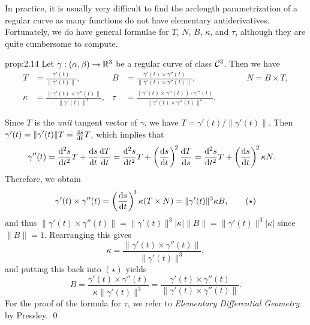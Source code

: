 In practice, it is usually very difficult to find the arclength 
parametrization of a regular curve as many functions do not 
have elementary antiderivatives. Fortunately, we do have general formulae for 
$T$, $N$, $B$, $\kappa$, and $\tau$, although they are quite cumbersome to 
compute.

\begin{prop}{prop:2.14}
    Let $\gamma : (\alpha, \beta) \to \mathbb{R}^3$ be a regular curve of class ${\cal C}^3$. 
    Then we have 
    \begin{align*}
        T &= \frac{\gamma'(t)}{\|\gamma'(t)\|}, &
        B &= \frac{\gamma'(t) \times \gamma''(t)}{\|\gamma'(t) \times \gamma''(t)\|}, \quad\quad\quad\quad\quad\quad 
        N = B \times T, \\ 
        \kappa &= \frac{\|\gamma'(t) \times \gamma''(t)\|}{\|\gamma'(t)\|^3}, &
        \tau &= \frac{(\gamma'(t) \times \gamma''(t)) \cdot \gamma'''(t)}{\|\gamma'(t) \times \gamma''(t)\|^2}.
    \end{align*}
\end{prop}\vspace{-0.25cm}
\newpage 
\begin{pf}
    Since $T$ is the \emph{unit} tangent vector of $\gamma$, we have 
    $T = \gamma'(t)/\|\gamma'(t)\|$. Then $\gamma'(t) = \|\gamma'(t)\|T 
    = \frac{{\rm d}s}{{\rm d}t} T$, which implies that 
    \begin{align*}
        \gamma''(t) &= \frac{{\rm d}^2 s}{{\rm d}t^2} T 
        + \frac{{\rm d}s}{{\rm d}t} \frac{{\rm d}T}{{\rm d}t} 
        = \frac{{\rm d}^2 s}{{\rm d}t^2} T 
        + \left(\frac{{\rm d}s}{{\rm d}t}\right)^{\!2} \frac{{\rm d}T}{{\rm d}s}
        = \frac{{\rm d}^2 s}{{\rm d}t^2} T 
        + \left(\frac{{\rm d}s}{{\rm d}t}\right)^{\!2} \kappa N. 
    \end{align*}
    Therefore, we obtain 
    \[ \gamma'(t) \times \gamma''(t) = 
    \left(\frac{{\rm d}s}{{\rm d}t}\right)^{\!3} \kappa(T \times N) 
    = \|\gamma'(t)\|^3 \kappa B, \tag{$\star$} \] 
    and thus $\|\gamma'(t) \times \gamma''(t)\| = \|\gamma'(t)\|^3 |\kappa| \|B\| 
    = \|\gamma'(t)\|^3 |\kappa|$ since $\|B\| = 1$. Rearranging this gives 
    \[ \kappa = \frac{\|\gamma'(t) \times \gamma''(t)\|}{\|\gamma'(t)\|^3}, \] 
    and putting this back into $(\star)$ yields 
    \[ B = \frac{\gamma'(t) \times \gamma''(t)}{\kappa \|\gamma'(t)\|^3} 
    = \frac{\gamma'(t) \times \gamma''(t)}{\|\gamma'(t) \times \gamma''(t)\|}. \] 
    For the proof of the formula for $\tau$, we refer to \emph{Elementary 
    Differential Geometry} by Pressley. \qed 
\end{pf}\vspace{-0.25cm} 

